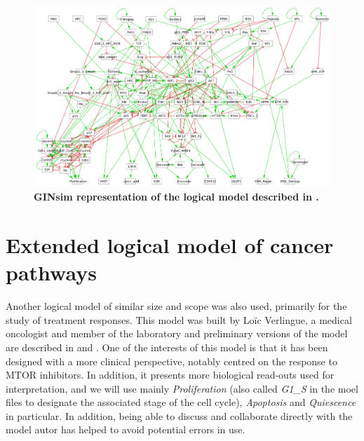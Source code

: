 \documentclass[a4paper,12pt,twoside,onecolumn,openright,final,oldfontcommands]{memoir}
\begin{document}
\begin{figure}

{\centering \includegraphics[width=0.9\linewidth]{fig/Fumia2013} 

}

\caption[Graphical abstract of PROFILE method to personalize logical models with omics data]{\textbf{GINsim representation of the logical model
described in \citet{fumia2013boolean}.}}\label{fig:Fumia}
\end{figure}




\section{Extended logical model of cancer
pathways}\label{appendix-verlingue}

Another logical model of similar size and scope was also used, primarily
for the study of treatment responses. This model was built by Loïc
Verlingue, a medical oncologist and member of the laboratory and
preliminary versions of the model are described in
\citet{verlingue2016comprehensive} and \citet{verlingue2016silico}. One
of the interests of this model is that it has been designed with a more
clinical perspective, notably centred on the response to MTOR
inhibitors. In addition, it presents more biological read-outs used for
interpretation, and we will use mainly \emph{Proliferation} (also called
\emph{G1\_S} in the moel files to designate the associated stage of the
cell cycle), \emph{Apoptosis} and \emph{Quiescence} in particular. In
addition, being able to discuss and collaborate directly with the model
autor has helped to avoid potential errors in use.
\end{document}
